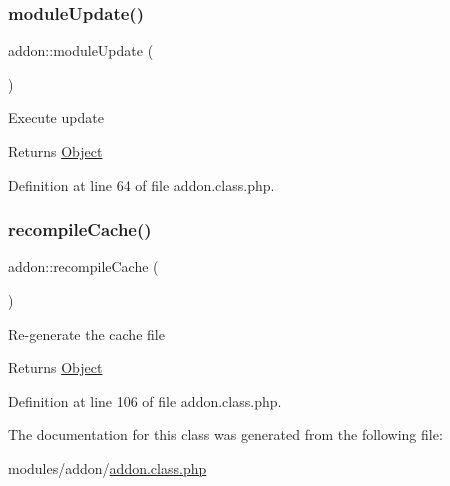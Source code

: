 \subsubsection{\texorpdfstring{module\+Update()}{moduleUpdate()}}
{\footnotesize\ttfamily addon\+::module\+Update (\begin{DoxyParamCaption}{ }\end{DoxyParamCaption})}

Execute update

\begin{DoxyReturn}{Returns}
\hyperlink{classObject}{Object} 
\end{DoxyReturn}


Definition at line 64 of file addon.\+class.\+php.

\hypertarget{classaddon_ad2d70e001c5ec84c799e31c4fa761d9c}{}\label{classaddon_ad2d70e001c5ec84c799e31c4fa761d9c} 
\subsubsection{\texorpdfstring{recompile\+Cache()}{recompileCache()}}
{\footnotesize\ttfamily addon\+::recompile\+Cache (\begin{DoxyParamCaption}{ }\end{DoxyParamCaption})}

Re-\/generate the cache file

\begin{DoxyReturn}{Returns}
\hyperlink{classObject}{Object} 
\end{DoxyReturn}


Definition at line 106 of file addon.\+class.\+php.



The documentation for this class was generated from the following file\+:\begin{DoxyCompactItemize}
\item 
modules/addon/\hyperlink{addon_8class_8php}{addon.\+class.\+php}\end{DoxyCompactItemize}
